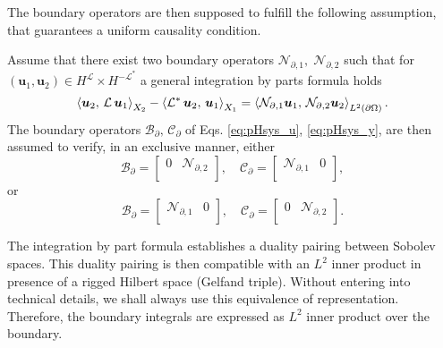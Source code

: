 The boundary operators are then supposed to fulfill the following assumption, that guarantees a uniform causality condition.

\begin{assumption}\label{ass:operBC}
	Assume that there exist  two boundary operators $\mathcal{N}_{\partial, 1}, \; \mathcal{N}_{\partial, 2}$ such that for $(\bm{u}_1, \bm{u}_2) \in H^\mathcal{L} \times H^\mathcal{-L^*}$ a general integration by parts formula holds
	\begin{equation}\label{eq:intbypartsJ} 
	\inner[X_2]{\bm{u}_2}{\mathcal{L}\,\bm{u}_1} - \inner[X_1]{\mathcal{L}^* \, \bm{u}_2}{\bm{u}_1} = \inner[L^2(\partial \Omega)]{\mathcal{N}_{\partial, 1} \bm{u}_1}{\mathcal{N}_{\partial, 2} \bm{u}_2}. 
	\end{equation}
	The boundary operators $\mathcal{B}_\partial, \, \mathcal{C}_\partial$ of Eqs. \eqref{eq:pHsys_u}, \eqref{eq:pHsys_y}, are then assumed to verify, in an exclusive manner, either
	\begin{equation}\label{eq:assB2C1}
	\mathcal{B}_\partial = \begin{bmatrix}
	0 & \mathcal{N}_{\partial, 2} \\
	\end{bmatrix}, \quad 
	\mathcal{C}_\partial = \begin{bmatrix}
	\mathcal{N}_{\partial, 1} & 0 \\
	\end{bmatrix},
	\end{equation}
	or 
	\begin{equation}\label{eq:assB1C2}
	\mathcal{B}_\partial = \begin{bmatrix}
	\mathcal{N}_{\partial, 1} & 0 \\
	\end{bmatrix}, \quad \mathcal{C}_\partial = \begin{bmatrix}
	0 & \mathcal{N}_{\partial, 2} \\
	\end{bmatrix}.
	\end{equation}

\end{assumption}

\begin{remark}
	The integration by part formula establishes a duality pairing between Sobolev spaces. This duality pairing is then compatible with an $L^2$ inner product in presence of a rigged Hilbert space (Gelfand triple). Without entering into technical details, we shall always use this equivalence of representation. Therefore, the boundary integrals are  expressed as $L^2$ inner product over the boundary. 
\end{remark}

